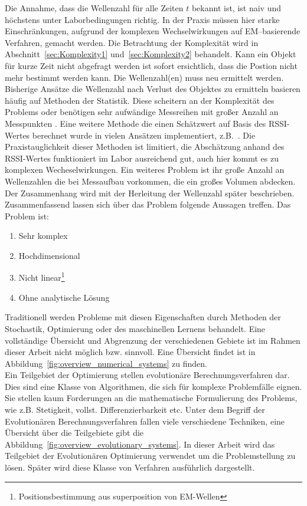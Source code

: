 Die Annahme, dass die Wellenzahl für alle Zeiten $t$ bekannt ist, ist naiv und höchstens unter Laborbedingungen richtig. In der Praxis müssen hier starke Einschränkungen, aufgrund der komplexen Wechselwirkungen auf EM--basierende Verfahren, gemacht werden. Die Betrachtung der Komplexität wird in Abschnitt~\ref{sec:Komplexity1} und~\ref{sec:Komplexity2} behandelt. Kann ein Objekt für kurze Zeit nicht abgefragt werden ist sofort ersichtlich, dass die Postion nicht mehr bestimmt werden kann. Die Wellenzahl(en) muss neu ermittelt werden.\\ 
%

Bisherige Ansätze die Wellenzahl nach Verlust des Objektes zu ermitteln basieren häufig auf Methoden der Statistik. Diese scheitern an der Komplexität des Problems oder benötigen sehr aufwändige Messreihen mit großer Anzahl an Messpunkten \cite{amedo1}. Eine weitere Methode die einen Schätzwert auf Basis des RSSI-Wertes berechnet wurde in vielen Ansätzen implementiert, z.B.~\cite{KALMANandSMOOTHING}. Die Praxistauglichkeit dieser Methoden ist limitiert, die Abschätzung anhand des RSSI-Wertes funktioniert im Labor ausreichend gut, auch hier kommt es zu komplexen Wecheselwirkungen. Ein weiteres Problem ist ihr große Anzahl an Wellenzahlen die bei Messaufbau vorkommen, die ein großes Volumen abdecken. Der Zusammenhang wird mit der Herleitung der Wellenzahl später beschrieben.\\
%

Zusammenfassend lassen sich über das Problem folgende Aussagen treffen. Das Problem ist: 
%
\begin{enumerate}[itemsep=0mm]
	\item Sehr komplex
	\item Hochdimensional
	\item Nicht linear\footnote{Positionsbestimmung aus superposition von EM-Wellen}
	\item Ohne analytische Lösung
\end{enumerate}
%

Traditionell werden Probleme mit diesen Eigenschaften durch Methoden der Stochastik, Optimierung oder des maschinellen Lernens behandelt. Eine vollständige Übersicht und Abgrenzung der verschiedenen Gebiete ist im Rahmen dieser Arbeit nicht möglich bzw. sinnvoll. Eine Übersicht findet ist in Abbildung~\ref{fig:overview_numerical_systems} zu finden.\\
%

Ein Teilgebiet der Optimierung stellen evolutionäre Berechnungsverfahren dar. Dies sind eine Klasse von Algorithmen, die sich für komplexe Problemfälle eignen. Sie stellen kaum Forderungen an die mathematische Formulierung des Problems, wie z.B. Stetigkeit, vollst. Differenzierbarkeit etc. Unter dem Begriff der Evolutionären Berechnungsverfahren fallen viele verschiedene Techniken, eine Übersicht über die Teilgebiete gibt die Abbildung~\ref{fig:overview_evolutionary_systems}. In dieser Arbeit wird das Teilgebiet der Evolutionären Optimierung verwendet um die Problemstellung zu lösen. Später wird diese Klasse von Verfahren ausführlich dargestellt.
%

